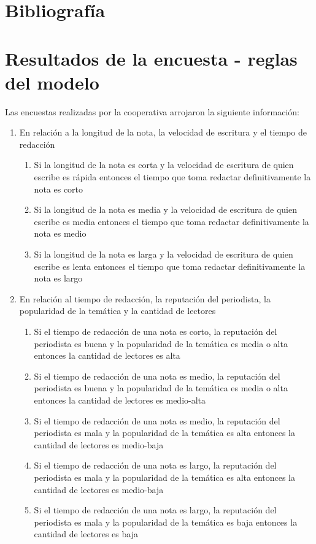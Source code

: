 \documentclass{article}
\begin{document}
\section{Bibliografía}

\pagebreak
\section*{Resultados de la encuesta - reglas del modelo}

Las encuestas realizadas por la cooperativa arrojaron la siguiente información:

\begin{enumerate}
	\item En relación a la longitud de la nota, la velocidad de escritura y el tiempo de redacción
		\begin{enumerate}
			\item Si la longitud de la nota es corta y la velocidad de escritura de quien escribe es rápida entonces el tiempo que toma redactar definitivamente la nota es corto
			\item Si la longitud de la nota es media y la velocidad de escritura de quien escribe es media entonces el tiempo que toma redactar definitivamente la nota es medio
			\item Si la longitud de la nota es larga y la velocidad de escritura de quien escribe es lenta entonces el tiempo que toma redactar definitivamente la nota es largo
		\end{enumerate}
	\item En relación al tiempo de redacción, la reputación del periodista, la popularidad de la temática y la cantidad de lectores
		\begin{enumerate}
			\item Si el tiempo de redacción de una nota es corto, la reputación del periodista es buena y la popularidad de la temática es media o alta entonces la cantidad de lectores es alta
			\item Si el tiempo de redacción de una nota es medio, la reputación del periodista es buena y la popularidad de la temática es media o alta entonces la cantidad de lectores es medio-alta
			\item Si el tiempo de redacción de una nota es medio, la reputación del periodista es mala y la popularidad de la temática es alta entonces la cantidad de lectores es medio-baja
			\item Si el tiempo de redacción de una nota es largo, la reputación del periodista es mala y la popularidad de la temática es alta entonces la cantidad de lectores es medio-baja
			\item Si el tiempo de redacción de una nota es largo, la reputación del periodista es mala y la popularidad de la temática es baja entonces la cantidad de lectores es baja
		\end{enumerate}
\end{enumerate}
\end{document}
